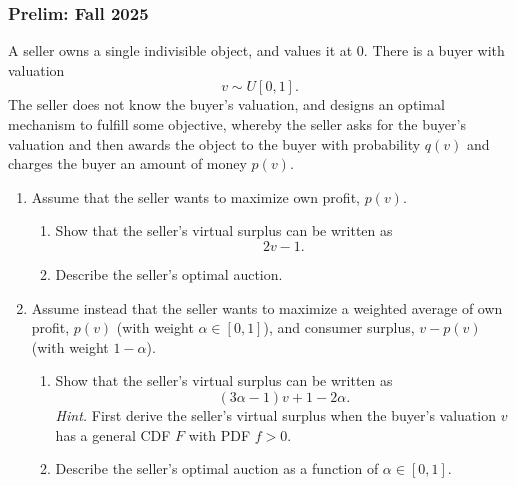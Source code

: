 \documentclass[11pt,english]{article}
\begin{document}
\subsubsection{Prelim: Fall 2025}\label{Rahman Prelim: Fall 2025}
A seller owns a single indivisible object, and values it at 0. There is a
buyer with valuation
\[
    v \sim U[0,1].
\]
The seller does not know the buyer's valuation, and designs an optimal
mechanism to fulfill some objective, whereby the seller asks for the buyer's
valuation and then awards the object to the buyer with probability $q(v)$ and
charges the buyer an amount of money $p(v)$.
 
\begin{enumerate}
    \item[(1)] Assume that the seller wants to maximize own profit, $p(v)$.
    \begin{enumerate}
        \item[(a)] Show that the seller's virtual surplus can be written as
            \[
                2v - 1.
            \]
        \begin{solution}
 	
        \end{solution}
 
        \item[(b)] Describe the seller's optimal auction.
        \begin{solution}
 
        \end{solution}
    \end{enumerate}
 
    \item[(2)] Assume instead that the seller wants to maximize a weighted
        average of own profit, $p(v)$ (with weight $\alpha \in [0,1]$), and
        consumer surplus, $v - p(v)$ (with weight $1 - \alpha$).
    \begin{enumerate}
        \item[(a)] Show that the seller's virtual surplus can be written as
            \[
                (3\alpha - 1)v + 1 - 2\alpha.
            \]
            \textit{Hint.} First derive the seller's virtual surplus when the
            buyer's valuation $v$ has a general CDF $F$ with PDF $f > 0$.
        \begin{solution}
 
        \end{solution}
 
        \item[(b)] Describe the seller's optimal auction as a function of
            $\alpha \in [0,1]$.
        \begin{solution}
 
        \end{solution}
    \end{enumerate}
\end{enumerate}
\end{document}
